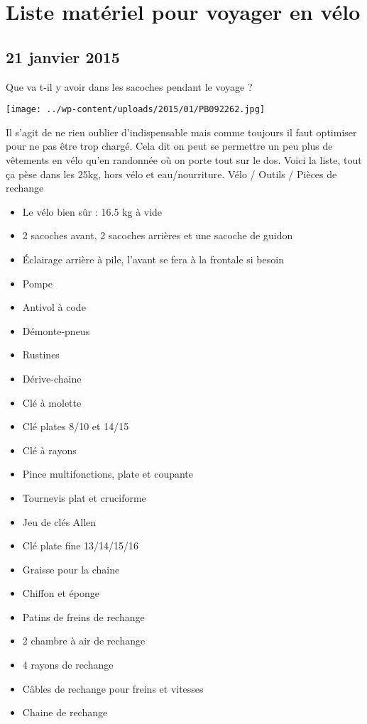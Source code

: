 \chapter{Liste matériel pour voyager en vélo}
\section*{21 janvier 2015}
Que va t-il y avoir dans les sacoches pendant le voyage ? \newline

\centerline{\texttt{[image: ../wp-content/uploads/2015/01/PB092262.jpg]} } 
 \newline
 Il s'agit de ne rien oublier d'indispensable mais comme toujours il faut optimiser pour ne pas être trop chargé. Cela dit on peut se permettre un peu plus de vêtements en vélo qu'en randonnée où on porte tout sur le dos. \newline
 Voici la liste, tout ça pèse dans les 25kg, hors vélo et eau/nourriture. \newline
 Vélo / Outils / Pièces de rechange \newline
 \begin{itemize}
 \item Le vélo bien sûr : 16.5 kg à vide
 \item 2 sacoches avant, 2 sacoches arrières et une sacoche de guidon
 \item Éclairage arrière à pile, l'avant se fera à la frontale si besoin
 \item Pompe
 \item Antivol à code
 \item Démonte-pneus
 \item Rustines
 \item Dérive-chaine
 \item Clé à molette
 \item Clé plates 8/10 et 14/15
 \item Clé à rayons
 \item Pince multifonctions, plate et coupante
 \item Tournevis plat et cruciforme
 \item Jeu de clés Allen
 \item Clé plate fine 13/14/15/16
 \item Graisse pour la chaine
 \item Chiffon et éponge
 \item Patins de freins de rechange
 \item 2 chambre à air de rechange
 \item 4 rayons de rechange
 \item Câbles de rechange pour freins et vitesses
 \item Chaine de rechange
 \end{itemize}
